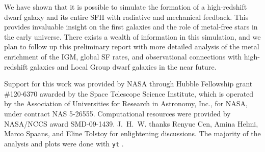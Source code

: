 \documentclass[apjl]{emulateapj}
\begin{document}
We have shown that it is possible to simulate the formation of a
high-redshift dwarf galaxy and its entire SFH with radiative and
mechanical feedback.  This provides invaluable insight on the first
galaxies and the role of metal-free stars in the early universe.
There exists a wealth of information in this simulation, and we plan
to follow up this preliminary report with more detailed analysis of
the metal enrichment of the IGM, global SF rates, and observational
connections with high-redshift galaxies and Local Group dwarf galaxies
in the near future.

\acknowledgments

Support for this work was provided by NASA through Hubble Fellowship
grant \#120-6370 awarded by the Space Telescope Science Institute,
which is operated by the Association of Universities for Research in
Astronomy, Inc., for NASA, under contract NAS 5-26555.  Computational
resources were provided by NASA/NCCS award SMD-09-1439.
J.~H.~W. thanks Renyue Cen, Amina Helmi, Marco Spaans, and Eline
Tolstoy for enlightening discussions.  The majority of the analysis
and plots were done with \texttt{yt} \citep{yt_full_paper}.

%

\end{document}
